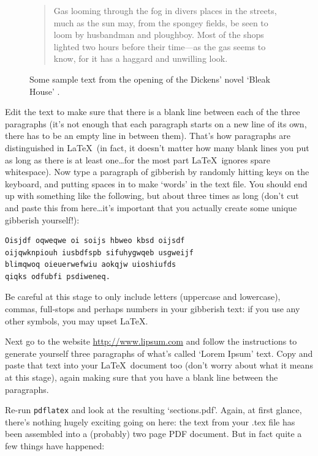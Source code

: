 \begin{figure}[tbp]
\begin{quote}
Gas looming through the fog in divers places in the streets, much as
the sun may, from the spongey fields, be seen to loom by husbandman
and ploughboy. Most of the shops lighted two hours before their
time---as the gas seems to know, for it has a haggard and unwilling
look.

\end{quote}

\caption{Some sample text from the opening of the Dickens' novel `Bleak House' \citep{dickens1852}.}\label{figure:bleakhouse}
\end{figure}

Edit the text to make sure that there is a blank line between each of the three paragraphs (it's not enough that each paragraph starts on a new line of its own, there has to be an empty line in between them). That's how paragraphs are distinguished in \LaTeX\ (in fact, it doesn't matter how many blank lines you put as long as there is at least one\ldots for the most part \LaTeX\ ignores spare whitespace). Now type a paragraph of gibberish by randomly hitting keys on the keyboard, and putting spaces in to make `words' in the text file. You should end up with something like the following, but about three times as long (don't cut and paste this from here\ldots it's important that you actually create some unique gibberish yourself!):

\begin{verbatim}
Oisjdf oqweqwe oi soijs hbweo kbsd oijsdf 
oijqwknpiouh iusbdfspb sifuhygwqeb usgweijf 
blimqwoq oieuerwefwiu aokqjw uioshiufds 
qiqks odfubfi psdiweneq.
\end{verbatim}

Be careful at this stage to only include letters (uppercase and lowercase), commas, full-stops and perhaps numbers in your gibberish text: if you use any other symbols, you may upset \LaTeX. 

Next go to the website \href{http://www.lipsum.com/}{http://www.lipsum.com} and follow the instructions to generate yourself three paragraphs of what's called `Lorem Ipsum' text. Copy and paste that text into your \LaTeX\ document too (don't worry about what it means at this stage), again making sure that you have a blank line between the paragraphs.

Re-run \texttt{pdflatex} and look at the resulting `sections.pdf'. Again, at first glance, there's nothing hugely exciting going on here: the text from your .tex file has been assembled into a (probably) two page PDF document. But in fact quite a few things have happened: 

